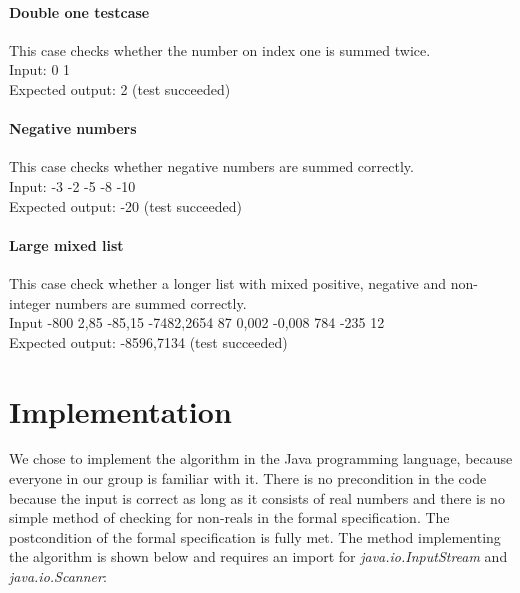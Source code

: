 \documentclass[12pt]{article}
\begin{document}
\paragraph{Double one testcase}
This case checks whether the number on index one is summed twice. \\
Input: {0 1} \\
Expected output: 2 (test succeeded)

\paragraph{Negative numbers}
This case checks whether negative numbers are summed correctly. \\
Input: {-3 -2 -5 -8 -10} \\
Expected output: -20 (test succeeded)

\paragraph{Large mixed list}
This case check whether a longer list with mixed positive, negative and non-integer numbers are summed correctly. \\
Input {-800 2,85 -85,15 -7482,2654 87 0,002 -0,008 784 -235 12} \\
Expected output: -8596,7134 (test succeeded)

\section{Implementation}
We chose to implement the algorithm in the Java programming language, because everyone in our group is familiar with it. There is no precondition in the code because the input is correct as long as it consists of real numbers and there is no simple method of checking for non-reals in the formal specification. The postcondition of the formal specification is fully met. The method implementing the algorithm is shown below and requires an import for \textsl{java.io.InputStream} and \textsl{java.io.Scanner}:
\end{document}

